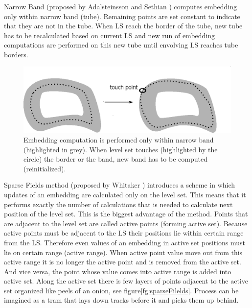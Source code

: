 Narrow Band (proposed by Adalsteinsson and Sethian \cite{sethianFastLS}) computes embedding only within narrow band (tube).
Remaining points are set constant to indicate that they are not in the tube.
When LS reach the border of the tube, new tube has to be recalculated based on current LS and new run of embedding computations are performed on this new tube until envolving LS reaches tube borders.

\begin{figure}
    \centering
    \includegraphics[width=\textwidth]{data/narrowBands}
    \caption[Narrow band computation illustration]{Embedding computation is performed only within narrow band (highlighted in grey). When level set touches (highlighted by the circle) the border or the band, new band has to be computed (reinitialized).}
    \label{fg:narrowBands}
\end{figure}

\par
Sparse Fields method (proposed by Whitaker \cite{sparseFilelds}) introduces a scheme in which updates of an embedding are calculated only on the level set.
This means that it performs exactly the number of calculations that is needed to calculate next position of the level set.
This is the biggest advantage of the method. Points that are adjacent to the level set are called active points (forming active set).
Because active points must be adjacent to the LS their positions lie within certain range from the LS.
Therefore even values of an embedding in active set positions must lie on certain range (active range).
When active point value move out from this active range it is no longer the active point and is removed from the active set.
And vice versa, the point whose value comes into active range is added into active set.
Along the active set there is few layers of points adjacent to the active set organized like peels of an onion, see figure\ref{fg:sparseFilelds}.
Process can be imagined as a tram that lays down tracks before it and picks them up behind.

